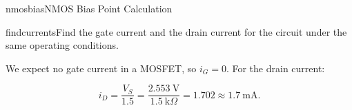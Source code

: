 \begin{mainquestion}{nmosbias}{NMOS Bias Point Calculation}
\begin{partquestion}{findcurrents}{Find the gate current and the drain current for the circuit under the same operating conditions.}
\begin{answer}
We expect no gate current in a MOSFET, so $i_{G} = 0$. For the drain current:

\[
i_{D} = \frac{V_{S}}{1.5} = \frac{2.553\ \text{V}}{1.5\ \text{k}\Omega} = 1.702 \approx1.7\ \text{mA}.
\]
\end{answer}
\end{partquestion}

\end{mainquestion}
